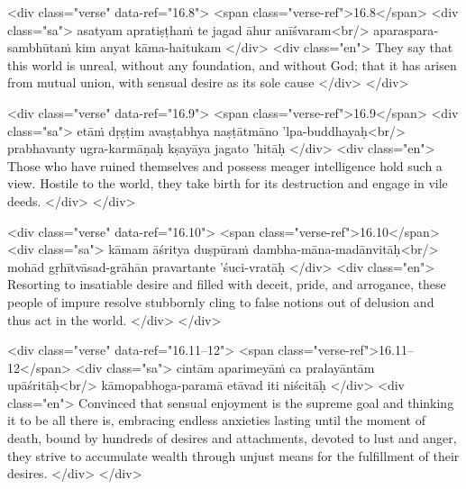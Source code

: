 \begin{html}
<div class="verse" data-ref="16.8">
  <span class="verse-ref">16.8</span>
  <div class="sa">
    asatyam apratiṣṭhaṁ te jagad āhur anīśvaram<br/>
    aparaspara-sambhūtaṁ kim anyat kāma-haitukam
  </div>
  <div class="en">
    They say that this world is unreal, without any foundation, and without God; that it has arisen from mutual union, with sensual desire as its sole cause
  </div>
</div>
\end{html}



\begin{html}
<div class="verse" data-ref="16.9">
  <span class="verse-ref">16.9</span>
  <div class="sa">
    etāṁ dṛṣṭim avaṣṭabhya naṣṭātmāno ’lpa-buddhayaḥ<br/>
    prabhavanty ugra-karmāṇaḥ kṣayāya jagato ’hitāḥ
  </div>
  <div class="en">
    Those who have ruined themselves and possess meager intelligence hold such a view. Hostile to the world, they take birth for its destruction and engage in vile deeds.
  </div>
</div>
\end{html}



\begin{html}
<div class="verse" data-ref="16.10">
  <span class="verse-ref">16.10</span>
  <div class="sa">
    kāmam āśritya duṣpūraṁ dambha-māna-madānvitāḥ<br/>
    mohād gṛhītvāsad-grāhān pravartante ’śuci-vratāḥ
  </div>
  <div class="en">
    Resorting to insatiable desire and filled with deceit, pride, and arrogance, these people of impure resolve stubbornly cling to false notions out of delusion and thus act in the world.
  </div>
</div>
\end{html}



\begin{html}
<div class="verse" data-ref="16.11–12">
  <span class="verse-ref">16.11–12</span>
  <div class="sa">
    cintām aparimeyāṁ ca pralayāntām upāśritāḥ<br/>
    kāmopabhoga-paramā etāvad iti niścitāḥ
  </div>
  <div class="en">
    Convinced that sensual enjoyment is the supreme goal and thinking it to be all there is, embracing endless anxieties lasting until the moment of death, bound by hundreds of desires and attachments, devoted to lust and anger, they strive to accumulate wealth through unjust means for the fulfillment of their desires.
  </div>
</div>
\end{html}



